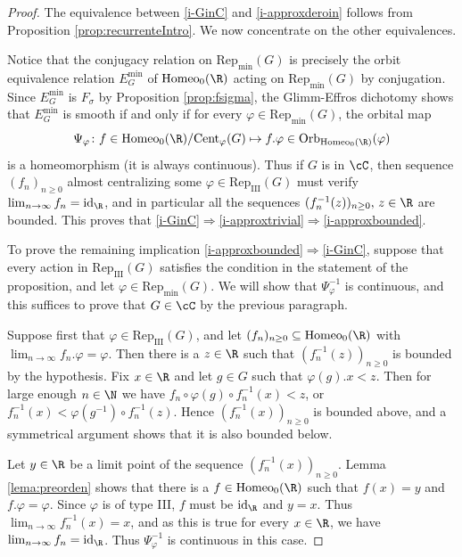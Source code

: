 \documentclass[reqno]{amsart}
\begin{document}
\begin{proof}
The equivalence between \eqref{i-GinC} and \eqref{i-approxderoin} follows from Proposition \ref{prop:recurrenteIntro}. We now concentrate on the other equivalences.

Notice that the conjugacy relation on $\mathrm{Rep}_\mathrm{min}(G)$ is precisely the orbit equivalence relation $E^\mathrm{min}_G$ of $\mathrm{Homeo}_0(\R)$ acting on $\mathrm{Rep}_\mathrm{min}(G)$ by conjugation. Since $E^\mathrm{min}_G$ is $F_\sigma$ by Proposition \ref{prop:fsigma}, the Glimm-Effros dichotomy shows that $E^\mathrm{min}_G$ is smooth if and only if for every $\varphi \in \mathrm{Rep}_\mathrm{min}(G)$, the orbital map
\[
	\Psi_\varphi \colon f \in \mathrm{Homeo}_0(\R)/\mathrm{Cent}_\varphi(G) \mapsto f.\varphi \in \mathrm{Orb}_{\mathrm{Homeo_0(\R)}} (\varphi)
\]
is a homeomorphism (it is always continuous). Thus if $G$ is in $\cC$, then sequence $(f_n)_{n \geq 0}$  almost centralizing some $\varphi \in \mathrm{Rep}_\mathrm{III}(G)$ must verify $\lim_{n \to \infty} f_n = \mathrm{id}_\R$, and in particular all the sequences $(f_n^{-1}(z))_{n \geq 0},\, z \in \R$ are bounded. This proves that \eqref{i-GinC}$\Rightarrow$\eqref{i-approxtrivial}$\Rightarrow$\eqref{i-approxbounded}.

To prove the remaining implication \eqref{i-approxbounded}$\Rightarrow$\eqref{i-GinC}, suppose that every action in $\mathrm{Rep}_\mathrm{III}(G)$ satisfies the condition in the statement of the proposition, and let $\varphi \in \mathrm{Rep}_\mathrm{min}(G)$. We will show that $\Psi_\varphi^{-1}$ is continuous, and this suffices to prove that $G \in \cC$ by the previous paragraph.

Suppose first that $\varphi \in \mathrm{Rep}_\mathrm{III}(G)$, and let $(f_n)_{n \geq 0} \subseteq \mathrm{Homeo}_0(\R)$ with $\lim_{n \to \infty} f_n.\varphi = \varphi$. Then there is a $z \in \R$ such that $(f_n^{-1}(z))_{n \geq 0}$ is bounded by the hypothesis.  Fix $x \in \R$ and let $g \in G$ such that $\varphi(g).x < z$. Then for large enough $n \in \N$ we have $f_n \circ \varphi(g) \circ f_n^{-1}(x) < z$, or $f_n^{-1}(x) < \varphi(g^{-1}) \circ f_n^{-1}(z)$. Hence $(f_n^{-1}(x))_{n \geq 0}$ is bounded above, and a symmetrical argument shows that it is also bounded below. 

Let $y \in \R$ be a limit point of the sequence $(f_n^{-1}(x))_{n \geq 0}$. Lemma \ref{lema:preorden} shows that there is a $f \in \mathrm{Homeo}_0(\R)$ such that $f(x) = y$ and $f.\varphi = \varphi$. Since $\varphi$ is of type III, $f$ must be $\mathrm{id}_\R$ and $y = x$. Thus $\lim_{n \to \infty} f_n^{-1}(x) = x$, and as this is true for every $x \in \R$, we have $\lim_{n \to \infty} f_n = \mathrm{id}_\R$. Thus $\Psi_\varphi^{-1}$ is continuous in this case.


\end{proof}
\end{document}
